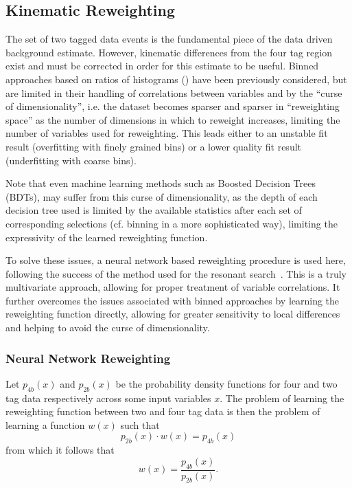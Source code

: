 \subsection{Kinematic Reweighting}
The set of two tagged data events is the fundamental piece of the data driven
background estimate. However, kinematic differences from the four tag region
exist and must be corrected in order for this estimate to be useful. Binned 
approaches based on ratios of histograms ()
have been previously considered, but are limited in their handling of correlations 
between variables and by the ``curse of dimensionality'', i.e. the dataset
becomes sparser and sparser in ``reweighting space'' as the number of dimensions
in which to reweight increases, limiting the number of variables used for reweighting. 
This leads either to an unstable fit result (overfitting with finely grained bins) or a 
lower quality fit result (underfitting with coarse bins).

Note that even machine learning methods such as Boosted Decision Trees (BDTs), may suffer
from this curse of dimensionality, as the depth of each decision tree used is limited by 
the available statistics after each set of corresponding selections (cf. binning in a 
more sophisticated way), limiting the expressivity of the learned reweighting function.

To solve these issues, a neural network based reweighting procedure is used
here, following the success of the method used for the resonant search~\cite{Abbott:2708605}. 
This is a truly multivariate approach, allowing for proper treatment of
variable correlations. It further overcomes the issues associated with binned
approaches by learning the reweighting function directly, allowing for greater
sensitivity to local differences and helping to avoid the curse of
dimensionality.


\subsubsection{Neural Network Reweighting}
Let $p_{4b}(x)$ and $p_{2b}(x)$ be the probability density functions for four and two tag data respectively across some input variables $x$. 
The problem of learning the reweighting function between two and four tag data is then the problem of learning a function $w(x)$ such that
\begin{equation}
p_{2b}(x) \cdot w(x) = p_{4b}(x)
\end{equation}
from which it follows that
\begin{equation}
w(x) = \frac{p_{4b}(x)}{p_{2b}(x)}.
\end{equation}

